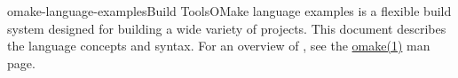 %
%
%
\begin{Name}{1}{omake-language-examples}{\authors}{Build Tools}{OMake language examples}
   is a flexible build system designed for building a wide variety of projects.
  This document describes the language concepts and syntax.
  For an overview of , see the \href{omake.html}{omake(1)} man page.
\end{Name}

